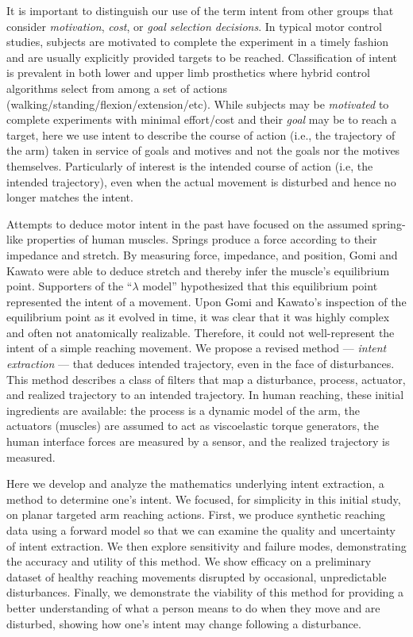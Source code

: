 \documentclass[10pt]{article}
\begin{document}
It is important to distinguish our use of the term intent from other groups that consider \textit{motivation}\cite{mcclelland1985motives, rawolle2013relationships}, \textit{cost}\cite{todorov2002optimal, flash1985coordination}, or \textit{goal selection decisions}\cite{ziebart2010modeling}. In typical motor control studies, subjects are motivated to complete the experiment in a timely fashion and are usually explicitly provided targets to be reached. Classification of intent is prevalent in both lower \cite{strausser2011development, hargrove2013robotic} and upper limb\cite{englehart2003robust, young2012improving} prosthetics where hybrid control algorithms select from among a set of actions (walking/standing/flexion/extension/etc). While subjects may be \textit{motivated} to complete experiments with minimal effort/cost and their \textit{goal} may be to reach a target, here we use intent to describe the course of action (i.e., the trajectory of the arm) taken in service of goals and motives and not the goals nor the motives themselves. Particularly of interest is the intended course of action (i.e, the intended trajectory), even when the actual movement is disturbed and hence no longer matches the intent.

Attempts to deduce motor intent in the past have focused on the assumed spring-like properties of human muscles. Springs produce a force according to their impedance and stretch. By measuring force, impedance, and position, Gomi and Kawato\cite{gomi1997human} were able to deduce stretch and thereby infer the muscle's equilibrium point. Supporters of the ``$\lambda$ model''\cite{feldman1995origin} hypothesized that this equilibrium point represented the intent of a movement. Upon Gomi and Kawato's inspection of the equilibrium point as it evolved in time, it was clear that it was highly complex and often not anatomically realizable. Therefore, it could not well-represent the intent of a simple reaching movement. We propose a revised method --- \textit{intent extraction} --- that deduces intended trajectory, even in the face of disturbances. This method describes a class of filters that map a disturbance, process, actuator, and realized trajectory to an intended trajectory. In human reaching, these initial ingredients are available: the process is a dynamic model of the arm, the actuators (muscles) are assumed to act as viscoelastic torque generators, the human interface forces are measured by a sensor, and the realized trajectory is measured. 

Here we develop and analyze the mathematics underlying intent extraction, a method to determine one's intent. We focused, for simplicity in this initial study, on planar targeted arm reaching actions. First, we produce synthetic reaching data using a forward model so that we can examine the quality and uncertainty of intent extraction. We then explore sensitivity and failure modes, demonstrating the accuracy and utility of this method. We show efficacy on a preliminary dataset of healthy reaching movements disrupted by occasional, unpredictable disturbances. Finally, we demonstrate the viability of this method for providing a better understanding of what a person means to do when they move and are disturbed, showing how one's intent may change following a disturbance. 
\end{document}
